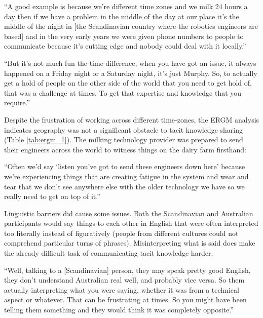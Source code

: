 \begin{displayquote}[Participant 1/2]
\small
\enquote{A good example is because we're different time zones and we milk 24 hours a day then if we have a problem in the middle of the day at our place it's the middle of the night in [the Scandinavian country where the robotics engineers are based] and in the very early years we were given phone numbers to people to communicate because it's cutting edge and nobody could deal with it locally.} 
\end{displayquote}


\begin{displayquote}[Participant 15/2]
\small
\enquote{But it's not much fun the time difference, when you have got an issue, it always happened on a Friday night or a Saturday night, it's just Murphy. So, to actually get a hold of people on the other side of the world that you need to get hold of, that was a challenge at times. To get that expertise and knowledge that you require.} 
\end{displayquote}


Despite the frustration of working across different time-zones, the ERGM analysis indicates geography was not a significant obstacle to tacit knowledge sharing (Table \ref{tab:ergm_1}). The milking technology provider was prepared to send their engineers across the world to witness things on the dairy farm firsthand:

\begin{displayquote}[Participant 9/2]
\small
\enquote{Often we'd say \enquote{listen you've got to send these engineers down here} because we're experiencing things that are creating fatigue in the system and wear and tear that we don't see anywhere else with the older technology we have so we really need to get on top of it.} 
\end{displayquote}


Linguistic barriers did cause some issues. Both the Scandinavian and Australian participants would say things to each other in English that were often interpreted too literally instead of figuratively (people from different cultures could not comprehend particular turns of phrases). Misinterpreting what is said does make the already difficult task of communicating tacit knowledge harder:

\begin{displayquote}[Participant 15/2]
\small
\enquote{Well, talking to a [Scandinavian] person, they may speak pretty good English, they don't understand Australian real well, and probably vice versa. So them actually interpreting what you were saying, whether it was from a technical aspect or whatever. That can be frustrating at times. So you might have been telling them something and they would think it was completely opposite.} 
\end{displayquote}


